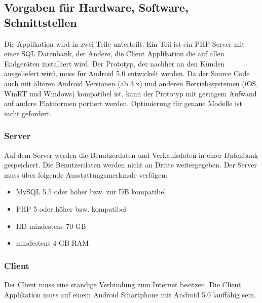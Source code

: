 \documentclass[a4paper,12pt,oneside]{scrartcl}
\begin{document}
\subsection{Vorgaben für Hardware, Software, Schnittstellen}
Die Applikation wird in zwei Teile unterteilt.
Ein Teil ist ein PHP-Server mit einer SQL Datenbank, der Andere, die Client Applikation die auf allen Endgeräten installiert wird.
Der Prototyp, der nachher an den Kunden ausgeliefert wird, muss für Android 5.0 entwickelt werden. 
Da der Source Code auch mit älteren Android Versionen (ab 3.x) und anderen Betriebssystemen (iOS, WinRT und Windows) kompatibel ist, kann der Prototyp mit geringem Aufwand auf andere Plattformen portiert werden.
Optimierung für genaue Modelle ist nicht gefordert.

\subsubsection*{Server}
Auf dem Server werden die Benutzerdaten und Verkaufsdaten in einer Datenbank gespeichert.
Die Benutzerdaten werden nicht an Dritte weitergegeben.
Der Server muss über folgende Ausstattungsmerkmale verfügen:
\begin{itemize}
	\item MySQL 5.5 oder höher bzw. zur DB kompatibel
	\item PHP 5 oder höher bzw. kompatibel
	\item HD mindestens 70 GB
	\item mindestens 4 GB RAM
\end{itemize}

\subsubsection*{Client}
Der Client muss eine ständige Verbindung zum Internet besitzen.
Die Client Applikation muss auf einem Android Smartphone mit Android 5.0 lauffähig sein.


\end{document}
